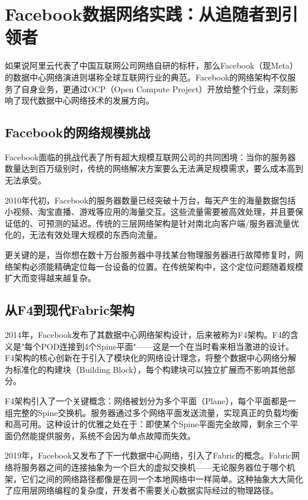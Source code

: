 \section{Facebook数据网络实践：从追随者到引领者}

如果说阿里云代表了中国互联网公司网络自研的标杆，那么Facebook（现Meta）的数据中心网络演进则堪称全球互联网行业的典范。Facebook的网络架构不仅服务了自身业务，更通过OCP（Open Compute Project）开放给整个行业，深刻影响了现代数据中心网络技术的发展方向。

\subsection{Facebook的网络规模挑战}

Facebook面临的挑战代表了所有超大规模互联网公司的共同困境：当你的服务器数量达到百万级别时，传统的网络解决方案要么无法满足规模需求，要么成本高到无法承受。

2010年代初，Facebook的服务器数量已经突破十万台，每天产生的海量数据包括小视频、淘宝直播、游戏等应用的海量交互。这些流量需要被高效处理，并且要保证低的、可预测的延迟。传统的三层网络架构是针对南北向客户端/服务器流量优化的，无法有效处理大规模的东西向流量。

更关键的是，当你想在数十万台服务器中寻找某台物理服务器进行故障修复时，网络架构必须能精确定位每一台设备的位置。在传统架构中，这个定位问题随着规模扩大而变得越来越复杂。

\subsection{从F4到现代Fabric架构}

2014年，Facebook发布了其数据中心网络架构设计，后来被称为F4架构。F4的含义是"每个POD连接到4个Spine平面"——这是一个在当时看来相当激进的设计。F4架构的核心创新在于引入了模块化的网络设计理念，将整个数据中心网络分解为标准化的构建块（Building Block），每个构建块可以独立扩展而不影响其他部分。

F4架构引入了一个关键概念：网络被划分为多个平面（Plane），每个平面都是一组完整的Spine交换机。服务器通过多个网络平面发送流量，实现真正的负载均衡和高可用。这种设计的优雅之处在于：即使某个Spine平面完全故障，剩余三个平面仍然能提供服务，系统不会因为单点故障而失效。

2019年，Facebook又发布了下一代数据中心网络，引入了Fabric的概念。Fabric网络将服务器之间的连接抽象为一个巨大的虚拟交换机——无论服务器位于哪个机架，它们之间的网络路径都像是在同一个本地网络中一样简单。这种抽象大大简化了应用层网络编程的复杂度，开发者不需要关心数据实际经过的物理路径。

